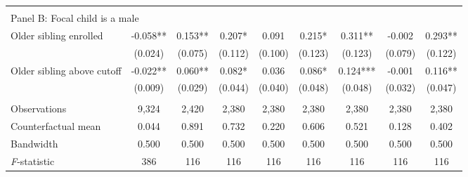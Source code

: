 {{\begin{tabular}{lcccccccc}
&  &  &  & & & & & \\
\multicolumn{10}{l}{Panel B: Focal child is a male} \\
Older sibling enrolled&      -0.058** &       0.153** &       0.207*  &       0.091   &       0.215*  &       0.311** &      -0.002   &       0.293** \\
                    &     (0.024)   &     (0.075)   &     (0.112)   &     (0.100)   &     (0.123)   &     (0.123)   &     (0.079)   &     (0.122)   \\
 
Older sibling above cutoff&      -0.022** &       0.060** &       0.082*  &       0.036   &       0.086*  &       0.124***&      -0.001   &       0.116** \\
                    &     (0.009)   &     (0.029)   &     (0.044)   &     (0.040)   &     (0.048)   &     (0.048)   &     (0.032)   &     (0.047)   \\
                    &               &               &               &               &               &               &               &               \\
Observations        &       9,324   &       2,420   &       2,380   &       2,380   &       2,380   &       2,380   &       2,380   &       2,380   \\
Counterfactual mean &       0.044   &       0.891   &       0.732   &       0.220   &       0.606   &       0.521   &       0.128   &       0.402   \\
Bandwidth           &       0.500   &       0.500   &       0.500   &       0.500   &       0.500   &       0.500   &       0.500   &       0.500   \\
\textit{F}-statistic&         386   &         116   &         116   &         116   &         116   &         116   &         116   &         116   \\
 

\bottomrule
\end{tabular}
}
}
